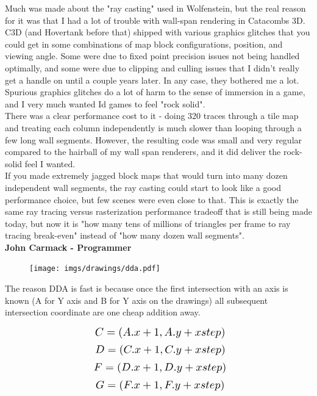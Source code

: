 \begin{fancyquotes}
\par
Much was made about the "ray casting" used in Wolfenstein, but the real reason for it was that I had a lot of trouble with wall-span rendering in Catacombs 3D.  C3D (and Hovertank before that) shipped with various graphics glitches that you could get in some combinations of map block configurations, position, and viewing angle.  Some were due to fixed point precision issues not being handled optimally, and some were due to clipping and culling issues that I didn't really get a handle on until a couple years later.  In any case, they bothered me a lot.  Spurious graphics glitches do a lot of harm to the sense of immersion in a game, and I very much wanted Id games to feel "rock solid".
 \bigskip \\
There was a clear performance cost to it - doing 320 traces through a tile map and treating each column independently is much slower than looping through a few long wall segments.  However, the resulting code was small and very regular compared to the hairball of my wall span renderers, and it did deliver the rock-solid feel I wanted.
 \bigskip \\
If you made extremely jagged block maps that would turn into many dozen independent wall segments, the ray casting could start to look like a good performance choice, but few scenes were even close to that.  This is exactly the same ray tracing versus rasterization performance tradeoff that is still being made today, but now it is "how many tens of millions of triangles per frame to ray tracing break-even" instead of "how many dozen wall segments".
 \bigskip \\
\textbf{John Carmack - Programmer}
 \end{fancyquotes}



 \par
\begin{figure}[H]
  \centering
 \texttt{[image: imgs/drawings/dda.pdf]}
\end{figure}
\par
The reason DDA is fast is because once the first intersection with an axis is known (A for Y axis and B for Y axis on the drawings) all subsequent intersection coordinate are one cheap addition away.
\par


\begin{equation*}
    \scalebox{1.3}{
$C = (A.x +1, A.y + xstep)$\\
}
\end{equation*}
\begin{equation*}
    \scalebox{1.3}{
$D = (C.x +1, C.y + xstep)$\\
}
\end{equation*}
\begin{equation*}
    \scalebox{1.3}{
$F = (D.x +1, D.y + xstep)$\\
}
\end{equation*}
\begin{equation*}
    \scalebox{1.3}{
$G = (F.x +1, F.y + xstep)$\\
}
\end{equation*}




